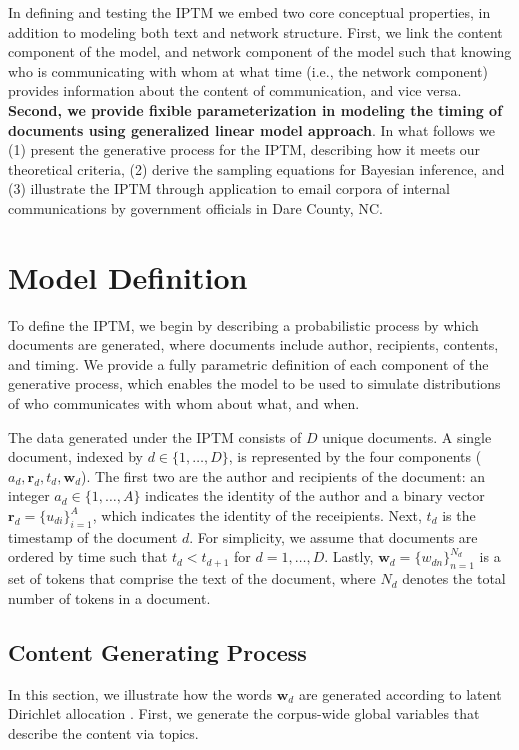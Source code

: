 \documentclass[twoside]{article}
\begin{document}
In defining and testing the IPTM we embed two core conceptual properties, in addition to modeling both text and network structure. First, we link the content component of the model, and network component of the model such that knowing who is communicating with whom at what time (i.e., the network component) provides information about the content of communication, and vice versa. \textbf{Second, we provide fixible parameterization in modeling the timing of documents using generalized linear model approach}. In what follows we (1) present the generative process for the IPTM, describing how it meets our theoretical criteria, (2) derive the sampling equations for Bayesian inference, and (3) illustrate the IPTM through application to email corpora of internal communications by government officials in Dare County, NC. 

\section{Model Definition}
To define the IPTM, we begin by describing a probabilistic process by which documents are generated, where documents include author, recipients, contents, and timing. We provide a fully parametric definition of each component of the generative process, which enables the model to be used to simulate distributions of who communicates with whom about what, and when.

The data generated under the IPTM consists of $D$ unique documents. A single document, indexed by $d \in \{1,\ldots,D\}$, is represented by the four components ($a_d, \boldsymbol{r}_d, t_d,  \boldsymbol{w}_d$). The first two are the author and recipients of the document: an integer $a_d \in \{1,\ldots,A\}$ indicates the identity of the author and a binary vector $\boldsymbol{r}_d = \{u_{di} \}_{i=1}^{A}$, which indicates the identity of the receipients. Next, $t_d$ is the timestamp of the document $d$. For simplicity, we assume that documents are ordered by time such that $t_d < t_{d+1}$ for $d=1, \ldots, D$. Lastly, $ \boldsymbol{w}_d= \{w_{dn} \}_{n=1}^{N_d}$ is a set of tokens that comprise the text of the document, where $N_d$ denotes the total number of tokens in a document.

\subsection{Content Generating Process}\label{subsec:Content generating process}

In this section, we illustrate how the words $\boldsymbol{w}_d$ are generated according to latent Dirichlet allocation \citep{Blei2003}. First, we generate the corpus-wide global variables that describe the content via topics. 
\end{document}

